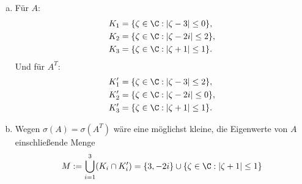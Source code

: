 \documentclass{mywork}
\begin{document}
\begin{aufgabe}
	\begin{enumerate}[a)]
		\item
			Für $A$:
			\begin{align*}
				K_1 &= \{ \zeta \in \C : | \zeta - 3 | \le 0 \}, \\
				K_2 &= \{ \zeta \in \C : | \zeta - 2i | \le 2 \}, \\
				K_3 &= \{ \zeta \in \C : | \zeta + 1 | \le 1 \}.
			\end{align*}
			Und für $A^T$:
			\begin{align*}
				K_1' &= \{ \zeta \in \C : | \zeta - 3 | \le 2 \}, \\
				K_2' &= \{ \zeta \in \C : | \zeta - 2i | \le 0 \}, \\
				K_3' &= \{ \zeta \in \C : | \zeta + 1 | \le 1 \}.
			\end{align*}
		\item
			Wegen $\sigma(A) = \sigma(A^T)$ wäre eine möglichst kleine, die Eigenwerte von $A$ einschließende Menge
			\[
				M := \bigcup_{i=1}^3 (K_i \cap K_i') = \{3, -2i \} \cup \{ \zeta \in \C : | \zeta + 1 | \le 1 \}
			\]
	\end{enumerate}
\end{aufgabe}
\end{document}
